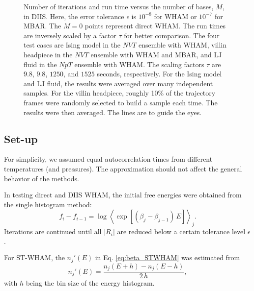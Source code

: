 \documentclass[reprint,aip,jcp,superscriptaddress]{revtex4-1}
\begin{document}
\begin{figure}[h]
  \caption{
    \label{fig:nsnt}
    Number of iterations
    and run time
    versus the number of bases, $M$,
    in DIIS.
    Here, the error tolerance
    $\epsilon$ is $10^{-8}$ for WHAM
    or $10^{-7}$ for MBAR.
    The $M = 0$ points represent direct WHAM.
    The run times are inversely scaled
    by a factor $\tau$
    for better comparison.
    The four test cases are
    Ising model in the $NVT$ ensemble with WHAM,
    villin headpiece in the $NVT$ ensemble with WHAM and MBAR,
    and
    LJ fluid in the $NpT$ ensemble with WHAM.
    The scaling factors $\tau$ are
    {\color{red} $9.8$, $9.8$, $1250$, and $1525$} seconds,
    respectively.
    For the Ising model and LJ fluid,
    the results were averaged
    over many independent samples.
    For the villin headpiece,
    roughly 10\% of the trajectory frames
    were randomly selected
    to build a sample each time.
    The results were then averaged.
    The lines are to guide the eyes.
  }
\end{figure}





\subsection{\label{sec:results_setup}
Set-up}



For simplicity,
we assumed equal autocorrelation times
from different temperatures (and pressures).
%
The approximation should not affect
the general behavior of the methods.



In testing direct and DIIS WHAM,
the initial free energies were obtained from
the single histogram method:
%
\begin{equation*}
f_i - f_{i-1}
=
\log
\left\langle
  \exp\left[
    (\beta_j - \beta_{j-1}) \, E
  \right]
\right\rangle_j.
\end{equation*}
%
Iterations are continued
until all $|R_i|$ are reduced
below a certain tolerance level $\epsilon$.



For ST-WHAM,
the $n_j'(E)$ in Eq. \eqref{eq:beta_STWHAM}
was estimated from
\begin{equation}
n_j'(E)
=
\frac{ n_j(E + h) - n_j(E - h) }
     { 2 \, h },
\label{eq:dn}
\end{equation}
with $h$ being the bin size
of the energy histogram.
\end{document}
